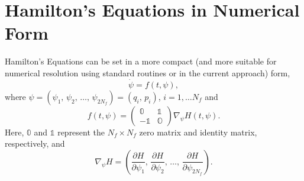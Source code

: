 \documentclass{article}
\newcommand{\pd}[2]{\frac{\partial#1}{\partial#2}}
\begin{document}
\section{Hamilton's Equations in Numerical Form}
Hamilton's
Equations can be set in a more compact (and more suitable for numerical resolution
using standard routines or in the current approach) form,
\begin{equation}\label{eq:HEterse}
  \dot \psi=f(t,\psi),
\end{equation}
where $\psi=(\psi_1,\,\psi_2,\,\ldots,\,\psi_{2N_f})=(q_i,\,p_i)$,
$i=1,\ldots N_f$ and
\begin{equation}
  f(t,\psi)=
  \begin{pmatrix}
    \mathbb{0}&\mathbb{1}\\
    -\mathbb{1} &\mathbb{O}
  \end{pmatrix}\nabla_\psi H(t,\psi).
\end{equation}
Here, $\mathbb{0}$ and $\mathbb{1}$ represent the $N_f\times N_f$ zero matrix
and identity matrix, respectively, and
\begin{equation*}
  \nabla_\psi H=\left(
    \pd{H}{\psi_1},\,
    \pd{H}{\psi_2},\,\ldots,\,
    \pd{H}{\psi_{2N_f}}
    \right).
\end{equation*}
\end{document}
